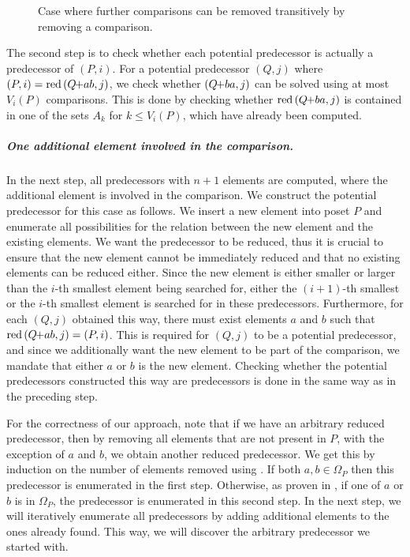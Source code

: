 \documentclass[a4paper,UKenglish,cleveref, autoref, thm-restate]{lipics-v2021}
\newcommand{\pchild}[3]{{#1}\kern-1pt{+}{#2}{#3}}
\newcommand{\reduced}[1]{\operatorname{red}{#1}}
\begin{document}
\begin{figure}[!b]
  \centering
  
  \caption{Case where further comparisons can be removed transitively by removing a comparison.}
  \label{fig:backward_problematic}
\end{figure}

The second step is to check whether each potential predecessor is actually a predecessor of $(P, i)$.
For a potential predecessor $(Q, j)$ where $(P, i) = \reduced{(\pchild{Q}{a}{b}, j)}$, we check whether $(\pchild{Q}{b}{a}, j)$ can be solved using at most $V_i(P)$ comparisons.
This is done by checking whether $\reduced{(\pchild{Q}{b}{a}, j)}$ is contained in one of the sets $A_k$ for $k \leq V_i(P)$, which have already been computed.


\subparagraph{One additional element involved in the comparison.}
In the next step, all predecessors with $n + 1$ elements are computed, where the additional element is involved in the comparison.
We construct the potential predecessor for this case as follows.
We insert a new element into poset $P$ and enumerate all possibilities for the relation between the new element and the existing elements.
We want the predecessor to be reduced, thus it is crucial to ensure that the new element cannot be immediately reduced and that no existing elements can be reduced either.
Since the new element is either smaller or larger than the $i$-th smallest element being searched for, either the $(i + 1)$-th smallest or the $i$-th smallest element is searched for in these predecessors.
Furthermore, for each $(Q, j)$ obtained this way, there must exist elements $a$ and $b$ such that $\reduced{(\pchild{Q}{a}{b}, j)} = (P, i)$.
This is required for $(Q, j)$ to be a potential predecessor, and since we additionally want the new element to be part of the comparison, we mandate that either $a$ or $b$ is the new element.
Checking whether the potential predecessors constructed this way are predecessors is done in the same way as in the preceding step.

For the correctness of our approach, note that if we have an arbitrary reduced predecessor, then by removing all elements that are not present in $P$, with the exception of $a$ and $b$, we obtain another reduced predecessor.
We get this by induction on the number of elements removed using .
If both $a, b \in \Omega_P$ then this predecessor is enumerated in the first step.
Otherwise, as proven in , if one of $a$ or $b$ is in $\Omega_P$, the predecessor is enumerated in this second step.
In the next step, we will iteratively enumerate all predecessors by adding additional elements to the ones already found.
This way, we will discover the arbitrary predecessor we started with.
\end{document}
